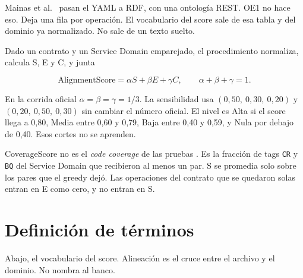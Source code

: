 Mainas et al.\ \cite{Mainas2023} pasan el YAML a RDF, con una ontología REST. OE1 no hace eso. Deja una fila por operación. El vocabulario del score sale de esa tabla y del dominio ya normalizado. No sale de un texto suelto.

Dado un contrato y un Service Domain emparejado, el procedimiento normaliza, calcula S, E y C, y junta

\[
\mathrm{AlignmentScore} = \alpha S + \beta E + \gamma C, \qquad \alpha+\beta+\gamma = 1.
\]

En la corrida oficial $\alpha = \beta = \gamma = 1/3$. La sensibilidad usa $(0{,}50,\ 0{,}30,\ 0{,}20)$ y $(0{,}20,\ 0{,}50,\ 0{,}30)$ sin cambiar el número oficial. El nivel es Alta si el score llega a 0,80, Media entre 0,60 y 0,79, Baja entre 0,40 y 0,59, y Nula por debajo de 0,40. Esos cortes no se aprenden.

CoverageScore no es el \textit{code coverage} de las pruebas \cite{Ehsan2022}. Es la fracción de tags \texttt{CR} y \texttt{BQ} del Service Domain que recibieron al menos un par. S se promedia solo sobre los pares que el greedy dejó. Las operaciones del contrato que se quedaron solas entran en E como cero, y no entran en S.

\section{Definición de términos}

Abajo, el vocabulario del score. Alineación es el cruce entre el archivo y el dominio. No nombra al banco.

